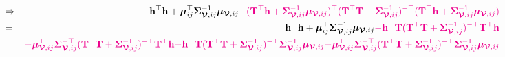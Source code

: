 \documentclass[12pt]{article}
\newcommand{\0}{\mathbf{0}}
\begin{document}
\begin{eqnarray*}
& \Rightarrow & \mathbf{h}^{\top} \mathbf{h} + \boldsymbol{\mu}_{ij}^{\top} \boldsymbol{\Sigma}_{\boldsymbol{\mathcal{V}}, ij}^{-1} \boldsymbol{\mu}_{\boldsymbol{\mathcal{V}}, ij} \textcolor{magenta}{- ( \mathbf{T}^{\top} \mathbf{h} + \boldsymbol{\Sigma}_{\boldsymbol{\mathcal{V}}, ij}^{-1}\boldsymbol{\mu}_{\boldsymbol{\mathcal{V}}, ij} )^{\top} ( \mathbf{T}^{\top} \mathbf{T} + \boldsymbol{\Sigma}_{\boldsymbol{\mathcal{V}}, ij}^{-1} )^{-\top} ( \mathbf{T}^{\top} \mathbf{h} + \boldsymbol{\Sigma}_{\boldsymbol{\mathcal{V}}, ij}^{-1}\boldsymbol{\mu}_{\boldsymbol{\mathcal{V}}, ij} ) } \\
& = & \mathbf{h}^{\top} \mathbf{h} + \boldsymbol{\mu}_{ij}^{\top} \boldsymbol{\Sigma}_{\boldsymbol{\mathcal{V}}, ij}^{-1} \boldsymbol{\mu}_{\boldsymbol{\mathcal{V}}, ij}  \textcolor{magenta}{ - \mathbf{h}^{\top} \mathbf{T} ( \mathbf{T}^{\top} \mathbf{T} + \boldsymbol{\Sigma}_{\boldsymbol{\mathcal{V}}, ij}^{-1} )^{-\top} \mathbf{T}^{\top} \mathbf{h} } \\
&&  \textcolor{magenta}{ - \boldsymbol{\mu}_{\boldsymbol{\mathcal{V}}, ij}^{\top}  \boldsymbol{\Sigma}_{\boldsymbol{\mathcal{V}}, ij}^{-\top} ( \mathbf{T}^{\top} \mathbf{T} + \boldsymbol{\Sigma}_{\boldsymbol{\mathcal{V}}, ij}^{-1} )^{-\top} \mathbf{T}^{\top} \mathbf{h} } \textcolor{magenta}{ -  \mathbf{h}^{\top} \mathbf{T} ( \mathbf{T}^{\top} \mathbf{T} + \boldsymbol{\Sigma}_{\boldsymbol{\mathcal{V}}, ij}^{-1} )^{-\top} \boldsymbol{\Sigma}_{\boldsymbol{\mathcal{V}}, ij}^{-1}\boldsymbol{\mu}_{\boldsymbol{\mathcal{V}}, ij}  } \textcolor{magenta}{ -  \boldsymbol{\mu}_{\boldsymbol{\mathcal{V}}, ij}^{\top}  \boldsymbol{\Sigma}_{\boldsymbol{\mathcal{V}}, ij}^{-\top}  ( \mathbf{T}^{\top} \mathbf{T} + \boldsymbol{\Sigma}_{\boldsymbol{\mathcal{V}}, ij}^{-1} )^{-\top} \boldsymbol{\Sigma}_{\boldsymbol{\mathcal{V}}, ij}^{-1}\boldsymbol{\mu}_{\boldsymbol{\mathcal{V}}, ij}  } 
\end{eqnarray*}
\end{document}
